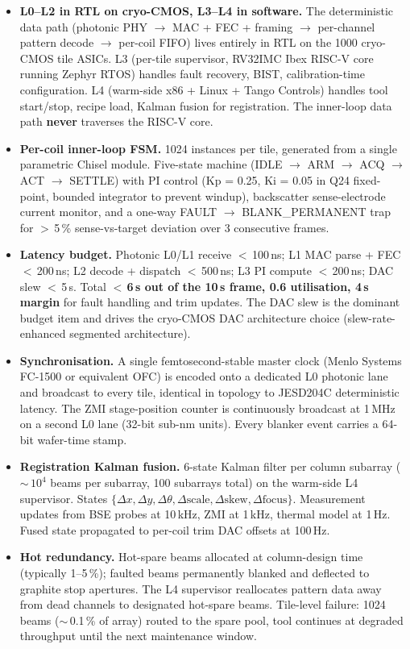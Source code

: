 \documentclass[11pt,letterpaper]{article}
\begin{document}
\begin{itemize}[leftmargin=1.6em]
  \item \textbf{L0--L2 in RTL on cryo-CMOS, L3--L4 in software.} The deterministic data path (photonic PHY $\to$ MAC + FEC + framing $\to$ per-channel pattern decode $\to$ per-coil FIFO) lives entirely in RTL on the 1000 cryo-CMOS tile ASICs. L3 (per-tile supervisor, RV32IMC Ibex RISC-V core running Zephyr RTOS) handles fault recovery, BIST, calibration-time configuration. L4 (warm-side x86 + Linux + Tango Controls) handles tool start/stop, recipe load, Kalman fusion for registration. The inner-loop data path \textbf{never} traverses the RISC-V core.
  \item \textbf{Per-coil inner-loop FSM.} 1024 instances per tile, generated from a single parametric Chisel module. Five-state machine (IDLE $\to$ ARM $\to$ ACQ $\to$ ACT $\to$ SETTLE) with PI control (Kp = 0.25, Ki = 0.05 in Q24 fixed-point, bounded integrator to prevent windup), backscatter sense-electrode current monitor, and a one-way FAULT $\to$ BLANK\_PERMANENT trap for $>$\,5\,\% sense-vs-target deviation over 3 consecutive frames.
  \item \textbf{Latency budget.} Photonic L0/L1 receive $<$\,100\,ns; L1 MAC parse + FEC $<$\,200\,ns; L2 decode + dispatch $<$\,500\,ns; L3 PI compute $<$\,200\,ns; DAC slew $<$\,5\,\textmu s. Total \textbf{$<$\,6\,\textmu s out of the 10\,\textmu s frame, 0.6 utilisation, 4\,\textmu s margin} for fault handling and trim updates. The DAC slew is the dominant budget item and drives the cryo-CMOS DAC architecture choice (slew-rate-enhanced segmented architecture).
  \item \textbf{Synchronisation.} A single femtosecond-stable master clock (Menlo Systems FC-1500 or equivalent OFC) is encoded onto a dedicated L0 photonic lane and broadcast to every tile, identical in topology to JESD204C deterministic latency. The ZMI stage-position counter is continuously broadcast at 1\,MHz on a second L0 lane (32-bit sub-nm units). Every blanker event carries a 64-bit wafer-time stamp.
  \item \textbf{Registration Kalman fusion.} 6-state Kalman filter per column subarray ($\sim$\,$10^4$ beams per subarray, 100 subarrays total) on the warm-side L4 supervisor. States $\{\Delta x, \Delta y, \Delta\theta, \Delta\text{scale}, \Delta\text{skew}, \Delta\text{focus}\}$. Measurement updates from BSE probes at 10\,kHz, ZMI at 1\,kHz, thermal model at 1\,Hz. Fused state propagated to per-coil trim DAC offsets at 100\,Hz.
  \item \textbf{Hot redundancy.} Hot-spare beams allocated at column-design time (typically 1--5\,\%); faulted beams permanently blanked and deflected to graphite stop apertures. The L4 supervisor reallocates pattern data away from dead channels to designated hot-spare beams. Tile-level failure: 1024 beams ($\sim$\,0.1\,\% of array) routed to the spare pool, tool continues at degraded throughput until the next maintenance window.

\end{itemize}
\end{document}
